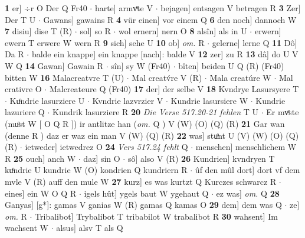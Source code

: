 \documentclass[8pt,a4paper,notitlepage]{article}
\begin{document}
\begin{table}[ht]
\begin{minipage}[t]{0.5\linewidth}
\textbf{1} er] ÷r O Der Q Fr40  $\cdot$ harte] armvͤte V  $\cdot$ bejagen] entsagen V betragen R \textbf{3} Zer] Der T U  $\cdot$ Gawans] gawains R \textbf{4} vür einen] vor einem Q \textbf{6} den noch] dannoch W \textbf{7} disiu] dise T (R)  $\cdot$ sol] so R  $\cdot$ wol ernern] nern O \textbf{8} alsîn] als in U  $\cdot$ erwern] ewern T erwere W wern R \textbf{9} sich] sehe U \textbf{10} ob] \textit{om.} R  $\cdot$ gelerne] lerne Q \textbf{11} Dô] Da R  $\cdot$ balde ein knappe] ein knappe [nach]: balde V \textbf{12} zer] zu R \textbf{13} dâ] do U V W Q \textbf{14} Gawan] Gawain R  $\cdot$ sîn] sy W (Fr40)  $\cdot$ bîten] beiden U Q (R) (Fr40) bitten W \textbf{16} Malacreatvre T (U)  $\cdot$ Mal creatv́re V (R)  $\cdot$ Mala creatúre W  $\cdot$ Mal crativre O  $\cdot$ Malcreateure Q (Fr40) \textbf{17} der] der selbe V \textbf{18} Kvndrye Lasursyere T  $\cdot$ Kuͦndrie lasurziere U  $\cdot$ Kvndrie lazvrzier V  $\cdot$ Kundrie lasursiere W  $\cdot$ Kundrie lazuriere Q  $\cdot$ Kundrik lasurziere R \textbf{20} \textit{Die Verse 517.20-21 fehlen} T U   $\cdot$ Er mvͤste (muͦst W [ O Q R ]) ir antlitze han (\textit{om.} Q ) V (W) (O) (Q) (R) \textbf{21} Gar wan (denne R ) daz er waz ein man V (W) (Q) (R) \textbf{22} was] stuͦnt U (V) (W) (O) (Q) (R)  $\cdot$ ietweder] ietwedrez O \textbf{24} \textit{Vers 517.24 fehlt} Q   $\cdot$ menschen] menschlichem W R \textbf{25} ouch] anch W  $\cdot$ daz] sin O  $\cdot$ sô] also V (R) \textbf{26} Kundrien] kvndryen T kuͦndrie U kundrie W (O) kondrien Q kundriern R  $\cdot$ ûf den mûl dort] dort vf dem mvle V (R) auff den mule W \textbf{27} kurz] es was kurtzt Q Kurczes schwarcz R  $\cdot$ eines] ein W O Q R  $\cdot$ igels hût] ygels baut W ygehaut Q  $\cdot$ ez was] \textit{om.} Q \textbf{28} Ganyas] [g*]: gamas V ganias W (R) gamas Q kamas O \textbf{29} dem] dem was Q  $\cdot$ ze] \textit{om.} R  $\cdot$ Tribalibot] Trybalibot T tribabilot W trabalibot R \textbf{30} wahsent] Im wachsent W  $\cdot$ alsus] alsv T als Q \newline
\end{minipage}
\end{table}
\end{document}

